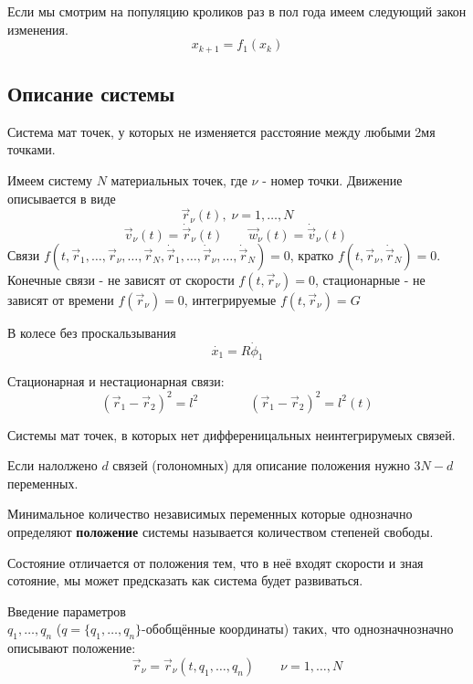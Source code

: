 \documentclass{article}
\begin{document}
\begin{eg}
  Если мы смотрим на популяцию кроликов раз в пол года имеем следующий закон изменения. 
  \[
    x_{k+1}=f_1(x_k)
  \]
\end{eg}

\subsection{Описание системы}
\begin{definition}
  Система мат точек, у которых не изменяется расстояние между любыми 2мя точками.
\end{definition}
Имеем систему $N$ материальных точек, где $\nu$ - номер точки. 
Движение описывается в виде
\[
  \vec{r}_\nu(t), \; \nu=1,\dots,N
\]
\[
\vec{v}_\nu(t)=\dot{\vec{r}}_\nu(t) \qquad \vec{w}_\nu(t)=\dot{\vec{v}}_\nu(t) \
\]
Связи $f(t,\vec{r}_1,\dots,\vec{r}_\nu,\dots,\vec{r}_N, \dot{\vec{r}}_1, \dots,\dot{\vec{r}}_\nu, \dots, \dot{\vec{r}}_N) =0$, кратко $f(t,\vec{r}_\nu,\dot{\vec{r}}_N)=0$. \\ 
Конечные связи - не зависят от скорости $f(t,\vec{r}_\nu)=0$, 
стационарные - не зависят от времени $f(\vec{r}_\nu)=0$, интегрируемые $f(t,\vec{r}_\nu)=G$

\begin{eg}
В колесе без проскальзывания
\[
  \dot{x_1}=R\dot{\phi}_1
\]
\end{eg}

\begin{eg}
  \incfig{l1_rod}
  Стационарная и нестационарная связи:
  \[
    (\vec{r}_1-\vec{r}_2)^2=l^2 \qquad\qquad (\vec{r}_1-\vec{r}_2)^2=l^2(t)
  \]
\end{eg}

\begin{definition}
  Системы мат точек, в которых нет дифференицальных неинтегрирумеых связей.
\end{definition}
\begin{remark}
  Если налолжено $d$ связей (голономных) для описание положения нужно $3N-d$ переменных.
\end{remark}
\begin{definition}
  Минимальное количество независимых переменных которые однозначно определяют \textbf{положение} системы называется количеством степеней свободы.
\end{definition}
\begin{remark}
  Состояние отличается от положения тем, что в неё входят скорости и зная сотояние, мы может предсказать как система будет развиваться.
\end{remark}
\begin{definition}
  Введение параметров \\ $q_1,\dots,q_n$ ($q=\{q_1,\dots,q_n\}$-обобщённые координаты) таких, что однозначнозначно описывают положение:
  \[
    \vec{r}_\nu=\vec{r}_\nu(t,q_1,\dots,q_n) \qquad \nu=1,\dots,N
  \]
\end{definition}
\end{document}
